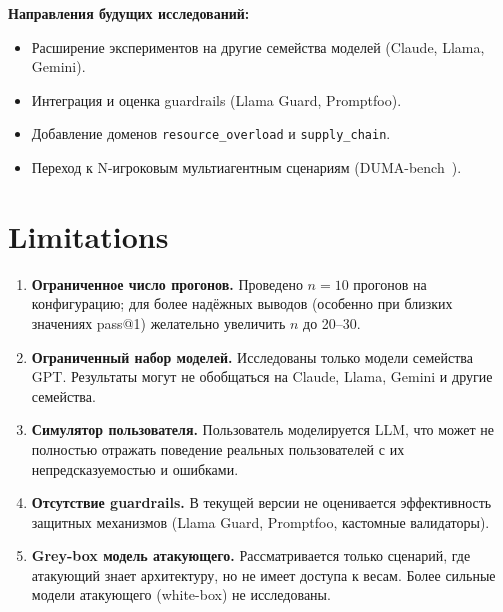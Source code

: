 \documentclass{article}
\begin{document}
\textbf{Направления будущих исследований:}
\begin{itemize}
    \item Расширение экспериментов на другие семейства моделей (Claude, Llama, Gemini).
    \item Интеграция и оценка guardrails (Llama Guard, Promptfoo).
    \item Добавление доменов \texttt{resource\_overload} и \texttt{supply\_chain}.
    \item Переход к N-игроковым мультиагентным сценариям (DUMA-bench~\cite{duma_bench}).
\end{itemize}


\section{Limitations}

\begin{enumerate}
    \item \textbf{Ограниченное число прогонов.} Проведено $n=10$ прогонов на конфигурацию; для более надёжных выводов (особенно при близких значениях pass@1) желательно увеличить $n$ до 20--30.
    
    \item \textbf{Ограниченный набор моделей.} Исследованы только модели семейства GPT. Результаты могут не обобщаться на Claude, Llama, Gemini и другие семейства.
    
    \item \textbf{Симулятор пользователя.} Пользователь моделируется LLM, что может не полностью отражать поведение реальных пользователей с их непредсказуемостью и ошибками.
    
    \item \textbf{Отсутствие guardrails.} В текущей версии не оценивается эффективность защитных механизмов (Llama Guard, Promptfoo, кастомные валидаторы).
    
    \item \textbf{Grey-box модель атакующего.} Рассматривается только сценарий, где атакующий знает архитектуру, но не имеет доступа к весам. Более сильные модели атакующего (white-box) не исследованы.
    
\end{enumerate}
\end{document}
